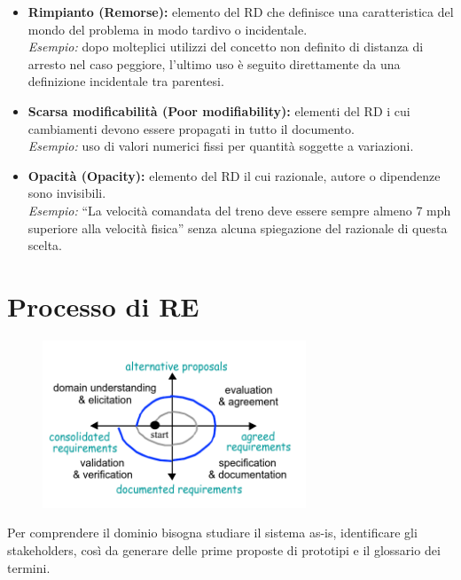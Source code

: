 \documentclass[../main.tex]{subfiles}
\begin{document}
\begin{itemize}
    \item \textbf{Rimpianto (Remorse):} elemento del RD che definisce una caratteristica del mondo del problema in modo tardivo o incidentale.\\
    \emph{Esempio:} dopo molteplici utilizzi del concetto non definito di distanza di arresto nel caso peggiore, l’ultimo uso è seguito direttamente da una definizione incidentale tra parentesi.
    
    \item \textbf{Scarsa modificabilità (Poor modifiability):} elementi del RD i cui cambiamenti devono essere propagati in tutto il documento.\\
    \emph{Esempio:} uso di valori numerici fissi per quantità soggette a variazioni.
    
    \item \textbf{Opacità (Opacity):} elemento del RD il cui razionale, autore o dipendenze sono invisibili.\\
    \emph{Esempio:} ``La velocità comandata del treno deve essere sempre almeno 7 mph superiore alla velocità fisica'' senza alcuna spiegazione del razionale di questa scelta.
\end{itemize}
\section{Processo di RE}
\begin{figure}[h]
    \centering
    \includegraphics[width=0.7\textwidth]{pictures/RE.png}
\end{figure} \noindent
Per comprendere il dominio bisogna studiare il sistema as-is, identificare gli stakeholders, così da generare delle prime proposte di prototipi e il glossario dei termini.
\end{document}
